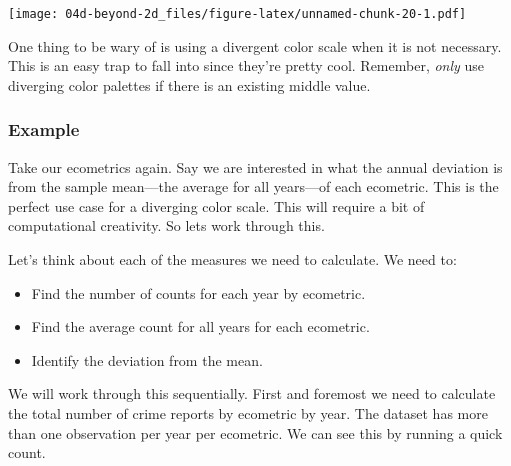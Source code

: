 \documentclass[
]{book}
\providecommand{\tightlist}{%
  \setlength{\itemsep}{0pt}\setlength{\parskip}{0pt}}
\begin{document}
\texttt{[image: 04d-beyond-2d\_files/figure-latex/unnamed-chunk-20-1.pdf]}

One thing to be wary of is using a divergent color scale when it is not necessary. This is an easy trap to fall into since they're pretty cool. Remember, \emph{only} use diverging color palettes if there is an existing middle value.

\hypertarget{example-1}{%
\subsubsection{Example}\label{example-1}}

Take our ecometrics again. Say we are interested in what the annual deviation is from the sample mean---the average for all years---of each ecometric. This is the perfect use case for a diverging color scale. This will require a bit of computational creativity. So lets work through this.

Let's think about each of the measures we need to calculate. We need to:

\begin{itemize}
\tightlist
\item
  Find the number of counts for each year by ecometric.
\item
  Find the average count for all years for each ecometric.
\item
  Identify the deviation from the mean.
\end{itemize}

We will work through this sequentially. First and foremost we need to calculate the total number of crime reports by ecometric by year. The dataset has more than one observation per year per ecometric. We can see this by running a quick count.
\end{document}

